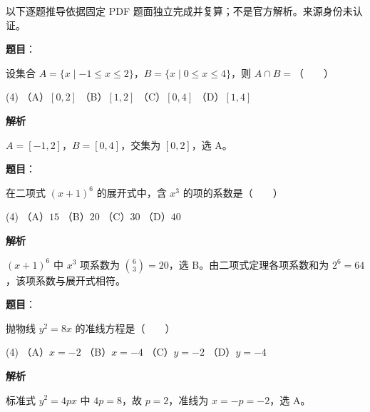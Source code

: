 

\begin{gktip}
以下逐题推导依据固定 PDF 题面独立完成并复算；不是官方解析。来源身份未认证。
\end{gktip}

\begin{answer}

\textbf{题目}：

设集合 $A=\{x\mid -1\leqslant x\leqslant 2\}$，$B=\{x\mid 0\leqslant x\leqslant 4\}$，则 $A\cap B=$\mbox{（　　）}

\begin{gkopts}(4)
\task （A）$[0,2]$
\task （B）$[1,2]$
\task （C）$[0,4]$
\task （D）$[1,4]$
\end{gkopts}

\textbf{解析}

$A=[-1,2]$，$B=[0,4]$，交集为 $[0,2]$，选 A。


\end{answer}
\begin{answer}

\textbf{题目}：

在二项式 $(x+1)^6$ 的展开式中，含 $x^3$ 的项的系数是\mbox{（　　）}

\begin{gkopts}(4)
\task （A）$15$
\task （B）$20$
\task （C）$30$
\task （D）$40$
\end{gkopts}

\textbf{解析}

$(x+1)^6$ 中 $x^3$ 项系数为 $\binom63=20$，选 B。由二项式定理各项系数和为 $2^6=64$，该项系数与展开式相符。


\end{answer}
\begin{answer}

\textbf{题目}：

抛物线 $y^2=8x$ 的准线方程是\mbox{（　　）}

\begin{gkopts}(4)
\task （A）$x=-2$
\task （B）$x=-4$
\task （C）$y=-2$
\task （D）$y=-4$
\end{gkopts}

\textbf{解析}

标准式 $y^2=4px$ 中 $4p=8$，故 $p=2$，准线为 $x=-p=-2$，选 A。


\end{answer}
